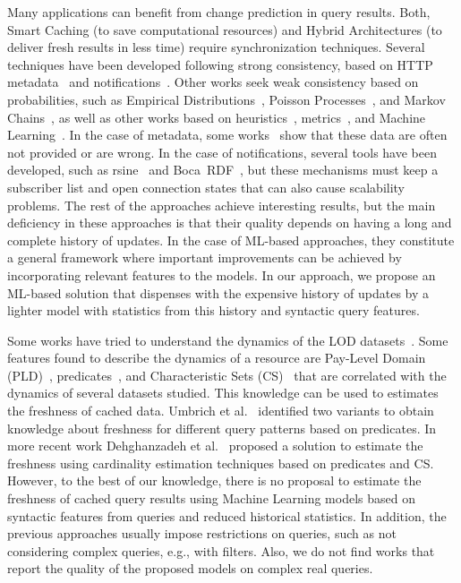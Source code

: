 \documentclass[runningheads]{llncs}
\begin{document}
Many applications can benefit from change prediction in query results. Both, Smart Caching (to save computational resources) and Hybrid Architectures (to deliver fresh results in less time) require synchronization techniques. Several techniques have been developed following strong consistency, based on HTTP metadata~\cite{fielding2rfc} and notifications~\cite{PassantM10,Fitzpatrick10,TrampFEA10}. Other works seek weak consistency based on probabilities, such as Empirical Distributions~\cite{NeumaierU16}, Poisson Processes~\cite{UmbrichHHPD10}, and Markov Chains~\cite{UmbrichMP15}, as well as other works based on heuristics~\cite{AliciAOCU12,UmbrichMP15,KnuthHS16}, metrics~\cite{DividinoGS15,KnuthHS16,AkhtarAL17}, and Machine Learning~\cite{NishiokaS17,GonzalezH18}. In the case of metadata, some works~\cite{UmbrichHHPD10,DividinoKG14,Kjernsmo15,NeumaierU16} show that these data are often not provided or are wrong. In the case of notifications, several tools have been developed, such as rsine~\cite{MaderMS14} and Boca~RDF~\cite{MissierACDG07}, but these mechanisms must keep a subscriber list and open connection states that can also cause scalability problems. The rest of the approaches achieve interesting results, but the main deficiency in these approaches is that their quality depends on having a long and complete history of updates. In the case of ML-based approaches, they constitute a general framework where important improvements can be achieved by incorporating relevant features to the models. In our approach, we propose an ML-based solution that dispenses with the expensive history of updates by a lighter model with statistics from this history and syntactic query features.

Some works have tried to understand the dynamics of the LOD datasets~\cite{UmbrichHHPD10,UmbrichKL10,KaferAUOH13,DividinoSGG13,NishiokaS16}. Some features found to describe the dynamics of a resource are Pay-Level Domain (PLD)~\cite{NishiokaS16,NishiokaS17}, predicates~\cite{KaferAUOH13,NishiokaS17}, and Characteristic Sets (CS)~\cite{NishiokaS16,GonzalezH18} that are correlated with the dynamics of several datasets studied. This knowledge can be used to estimates the freshness of cached data. Umbrich et al.~\cite{UmbrichKHP12,UmbrichKPPH12,ekawUmbrichKHP12} identified two variants to obtain knowledge about freshness for different query patterns based on predicates. In more recent work Dehghanzadeh et al.~\cite{DehghanzadehPKUHD14} proposed a solution to estimate the freshness using cardinality estimation techniques based on predicates and CS. However, to the best of our knowledge, there is no proposal to estimate the freshness of cached query results using Machine Learning models based on syntactic features from queries and reduced historical statistics. In addition, the previous approaches usually impose restrictions on queries, such as not considering complex queries, e.g., with filters. Also, we do not find works that report the quality of the proposed models on complex real queries.
\end{document}
